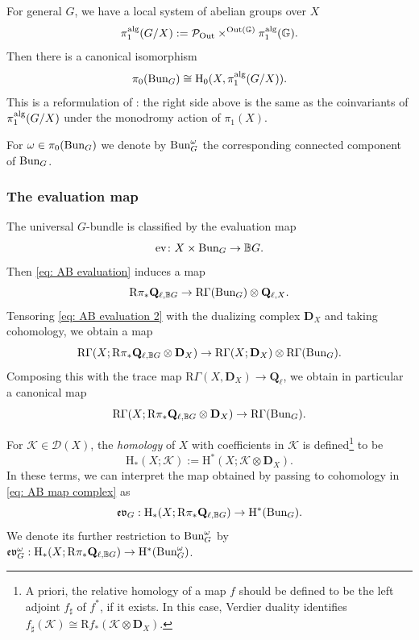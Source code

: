 \documentclass[reqno]{amsart}
\numberwithin{equation}{subsection}
\theoremstyle{definition}
\def\BB{\mathbb{B}}
\def\GG{\mathbb{G}}
\newcommand\cD{\mathcal{D}}
\newcommand\cK{\mathcal{K}}
\newcommand\cP{\mathcal{P}}
\def\bD{\mathbf{D}}
\newcommand\alg{\textup{alg}}
\newcommand{\Bun}{\textup{Bun}}
\newcommand\ev{\textup{ev}}
\newcommand\Out{\textup{Out}}
\newcommand{\Ql}{\Q_{\ell}}
\newcommand{\homog}[2]{\textup{H}_{#1}({#2})}  %
\newcommand{\om}{\omega}
\newcommand\sh{\sharp}
\newcommand\frev{\mathfrak{ev}}
\newcommand{\Q}{\mathbf{Q}}
\newcommand{\Qll}[1]{\Q_{\ell, #1}}
\newcommand{\co}{\colon}
\newcommand{\RGamma}{\rR \Gamma}
\newcommand{\rH}{\ensuremath{\mathrm{H}}\xspace}
\newcommand{\rR}{\ensuremath{\mathrm{R}}\xspace}
\begin{document}
For general $G$, we have a local system of abelian groups over $X$
\begin{equation*}
\pi^{\alg}_{1}(G/X):=\cP_{\Out}\times^{\Out(\GG)}\pi_{1}^{\alg}(\GG).
\end{equation*}
Then there is a canonical isomorphism
\begin{equation}\label{eq:bunG_connected_components}
\pi_{0}(\Bun_{G})\cong \homog{0}{X, \pi^{\alg}_{1}(G/X)}.
\end{equation}
This is a reformulation of \cite[Theorem 2]{Hei10}: the right side above is the same as the coinvariants of $\pi^{\alg}_{1}(G/X)$ under the monodromy action of $\pi_{1}(X)$. 

For $\om\in \pi_{0}(\Bun_{G})$ we denote by $\Bun_G^\omega$ the corresponding %
connected component of $\Bun_G$. 


\subsubsection{The evaluation map} The universal $G$-bundle is classified by the evaluation map 
\begin{equation}\label{eq: AB evaluation}
\ev\co X \times \Bun_G \rightarrow \BB G.
\end{equation}
Then \eqref{eq: AB evaluation} induces a map  
\begin{equation}\label{eq: AB evaluation 2}
\rR \pi_* \Qll{\BB G}   \rightarrow \rR \Gamma(\Bun_G) \otimes \Qll{X}.
\end{equation}
Tensoring \eqref{eq: AB evaluation 2} with the dualizing complex $\bD_X$ and taking cohomology, we obtain a map 
\[
\RGamma (X; \rR \pi_* \Qll{\BB G}  \otimes \bD_X) \rightarrow  \RGamma(X; \bD_X) \otimes \RGamma(\Bun_G).
\]
Composing this with the trace map $\RGamma(X, \bD_X) \rightarrow \Ql$, we obtain in particular a canonical map 
\begin{equation}\label{eq: AB map complex}
\RGamma(X; \rR \pi_* \Qll{\BB G} \otimes \bD_X) \rightarrow  \RGamma(\Bun_G).
\end{equation}

For $\cK\in \cD(X)$, the \emph{homology} of $X$ with coefficients in $\cK$ is defined\footnote{A priori, the relative homology of a map $f$ should be defined to be the left adjoint $f_{\sh}$ of $f^*$, if it exists. In this case, Verdier duality identifies $f_{\sh}(\cK) \cong \rR f_{*} (\cK \otimes \bD_X)$.} to be
\[
\rH_*(X; \cK) := \rH^*(X; \cK \otimes \bD_X).
\]
In these terms, we can interpret the map obtained by passing to cohomology in \eqref{eq: AB map complex} as
\begin{equation}\label{eq: AB map homology}
\frev_{G}: \rH_{*}(X; \rR \pi_* \Qll{\BB G}) \rightarrow  \rH^{*}(\Bun_G).
\end{equation}
We denote its further restriction to $\Bun_{G}^{\om}$ by $\frev^{\om}_{G}: \rH_{*}(X; \rR \pi_* \Qll{\BB G}) \rightarrow  \rH^{*}(\Bun^{\om}_G)$.
\end{document}
